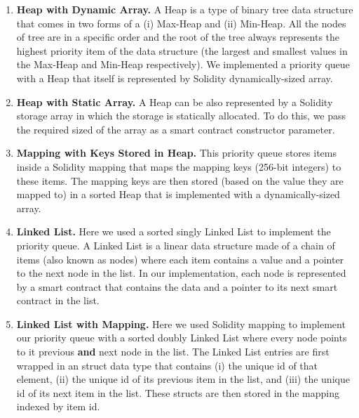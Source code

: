 \begin{enumerate}


\item\textbf{{Heap with Dynamic Array.}} A Heap is a type of binary tree data structure that comes in two forms of a (i) Max-Heap and (ii) Min-Heap. All the nodes of tree are in a specific order and the root of the tree always represents the highest priority item of the data structure (the largest and smallest values in the Max-Heap and Min-Heap respectively). We implemented a priority queue with a Heap that itself is represented by Solidity dynamically-sized array.  


\item\textbf{{Heap with Static Array.}} A Heap can be also represented by a Solidity storage array in which the storage is statically allocated. To do this, we pass the required sized of the array as a smart contract constructor parameter. 


\item\textbf{{Mapping with Keys Stored in Heap.}} This priority queue stores items inside a Solidity mapping that maps the mapping keys (256-bit integers) to these items. The mapping keys are then stored (based on the value they are mapped to) in a sorted Heap that is implemented with a dynamically-sized array.


\item\textbf{{Linked List.}} Here we used a sorted singly Linked List to implement the priority queue. A Linked List is a linear data structure made of a chain of items (also known as nodes) where each item contains a value and a pointer to the next node in the list. In our implementation, each node is represented by a smart contract that contains the data and a pointer to its next smart contract in the list.


\item\textbf{{Linked List with Mapping.}} Here we used Solidity mapping to implement our priority queue with a sorted doubly Linked List where every node points to it previous \textbf{and} next node in the list. The Linked List entries are first wrapped in an struct data type that contains (i) the unique id of that element, (ii) the unique id of its previous item in the list, and (iii) the unique id of its next item in the list. These structs are then stored in the mapping indexed by item id. 


\end{enumerate}

